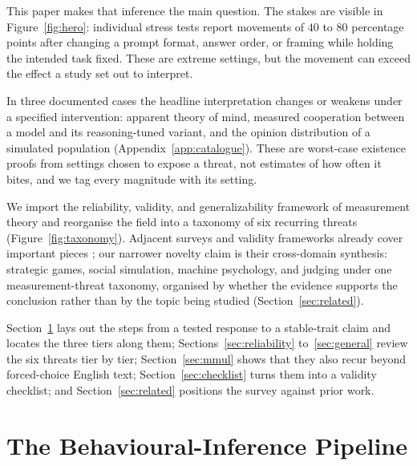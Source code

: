 \documentclass[11pt]{article}
\begin{document}
This paper makes that inference the main question. The stakes are visible in
Figure~\ref{fig:hero}: individual stress tests report movements of $40$ to $80$
percentage points after changing a prompt format, answer order, or framing while
holding the intended task fixed. These are extreme settings, but the movement
can exceed the effect a study set out to interpret.

In three documented cases the headline interpretation changes or weakens under
a specified intervention: apparent theory of mind, measured
cooperation between a model and its reasoning-tuned variant, and the opinion
distribution of a simulated population (Appendix~\ref{app:catalogue}). These are
worst-case existence proofs from settings chosen to expose a threat, not
estimates of how often it bites, and we tag every magnitude with its setting.

We import the reliability, validity, and generalizability framework of
measurement theory and reorganise the field into a taxonomy of six recurring
threats (Figure~\ref{fig:taxonomy}). Adjacent surveys and validity frameworks
already cover important pieces \cite{lin2025prompts,wallach2025position,%
bean2025measuring,ivanova2025evaluate}; our narrower novelty claim is their
cross-domain synthesis: strategic games, social simulation, machine psychology,
and judging under one measurement-threat taxonomy, organised by whether the
evidence supports the conclusion rather than by the topic being studied
(Section~\ref{sec:related}).

Section~\ref{sec:frame} lays out the steps from a tested response to a
stable-trait claim and locates the three tiers along them;
Sections~\ref{sec:reliability} to~\ref{sec:general} review the six threats
tier by tier; Section~\ref{sec:mmul} shows that they also recur beyond
forced-choice English text; Section~\ref{sec:checklist} turns them into a validity
checklist; and Section~\ref{sec:related} positions the survey against prior
work.

\section{The Behavioural-Inference Pipeline}
\label{sec:frame}
\end{document}
